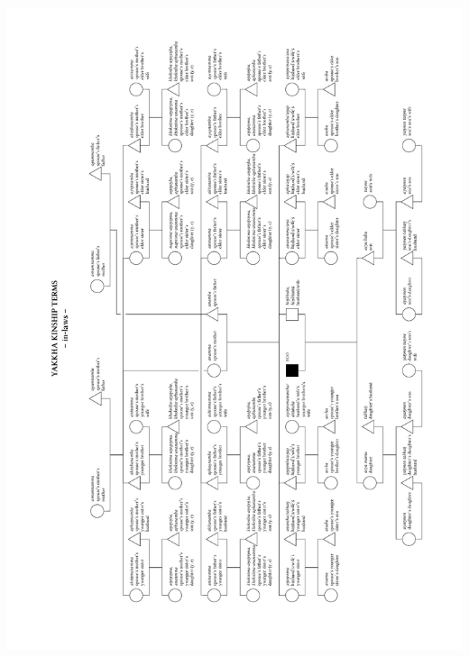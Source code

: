 \documentclass[output=coverbod             %
		,biblatex
		  ]{LSP/langsci}
\begin{document}
  \includegraphics[height=.88\textheight]{figures/90Grad_Verwandtschaft_Schwiegerfamilie_zum_Einbinden.pdf}

  



 



\end{document}
